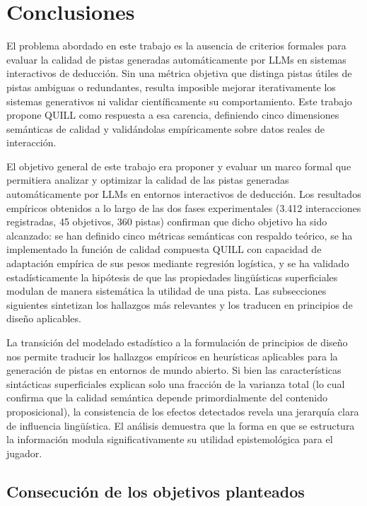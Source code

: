 \documentclass[../main.tex]{subfiles}
\begin{document}
\section{Conclusiones}

El problema abordado en este trabajo es la ausencia de criterios formales para evaluar la calidad de pistas generadas automáticamente por LLMs en sistemas interactivos de deducción. Sin una métrica objetiva que distinga pistas útiles de pistas ambiguas o redundantes, resulta imposible mejorar iterativamente los sistemas generativos ni validar científicamente su comportamiento. Este trabajo propone QUILL como respuesta a esa carencia, definiendo cinco dimensiones semánticas de calidad y validándolas empíricamente sobre datos reales de interacción.

El objetivo general de este trabajo era proponer y evaluar un marco formal que permitiera analizar y optimizar la calidad de las pistas generadas automáticamente por LLMs en entornos interactivos de deducción. Los resultados empíricos obtenidos a lo largo de las dos fases experimentales (3.412 interacciones registradas, 45 objetivos, 360 pistas) confirman que dicho objetivo ha sido alcanzado: se han definido cinco métricas semánticas con respaldo teórico, se ha implementado la función de calidad compuesta QUILL con capacidad de adaptación empírica de sus pesos mediante regresión logística, y se ha validado estadísticamente la hipótesis de que las propiedades lingüísticas superficiales modulan de manera sistemática la utilidad de una pista. Las subsecciones siguientes sintetizan los hallazgos más relevantes y los traducen en principios de diseño aplicables.

La transición del modelado estadístico a la formulación de principios de diseño nos permite traducir los hallazgos empíricos en heurísticas aplicables para la generación de pistas en entornos de mundo abierto. Si bien las características sintácticas superficiales explican solo una fracción de la varianza total (lo cual confirma que la calidad semántica depende primordialmente del contenido proposicional), la consistencia de los efectos detectados revela una jerarquía clara de influencia lingüística. El análisis demuestra que la forma en que se estructura la información modula significativamente su utilidad epistemológica para el jugador.

\subsection{Consecución de los objetivos planteados}
\end{document}
